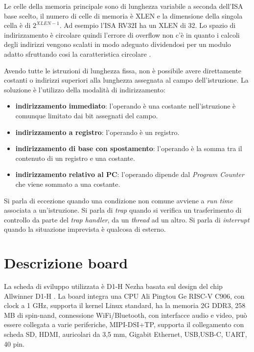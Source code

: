 \documentclass[12pt, a4paper]{report}
\begin{document}
Le celle della memoria principale sono di lunghezza variabile a seconda dell'ISA base scelto, il numero di celle di memoria è XLEN e la dimensione della singola cella è di $2^{XLEN - 1}$. Ad esempio l'ISA RV32I ha un XLEN di 32. Lo spazio di indirizzamento è circolare quindi l'errore di overflow non c'è in quanto i calcoli degli indirizzi vengono scalati in modo adeguato dividendosi per un modulo adatto sfruttando cosi la caratteristica circolare \cite{ISA}.


Avendo tutte le istruzioni di lunghezza fissa, non è possibile avere direttamente costanti o indirizzi superiori alla lunghezza assegnata al campo dell'istruzione. La soluzione è l'utilizzo della modalità di indirizzamento:
\begin{itemize}
	\item \textbf{indirizzamento immediato}: l’operando è una costante nell’istruzione è comunque limitato dai bit assegnati del campo.
	\item \textbf{indirizzamento a registro}: l’operando è un registro.
	\item \textbf{indirizzamento di base con spostamento}: l’operando è la somma tra il
contenuto di un registro e una costante.
\item \textbf{indirizzamento relativo al PC}: l'operando dipende dal \textit{Program Counter} che viene sommato a una costante.
\end{itemize}


Si parla di eccezione quando una condizione non comune avviene a \textit{run time} associata a un'istruzione.
Si parla di \textit{trap} quando si verifica un trasferimento di controllo da parte del \textit{trap handler}, da un \textit{thread} ad un altro. Si parla di \textit{interrupt} quando la situazione imprevista è qualcosa di esterno.



\section{Descrizione board} 

La scheda di sviluppo utilizzata è D1-H Nezha basata sul design del chip Allwinner D1-H \cite{DocH1}. La board integra una CPU Ali Pingtou Ge RISC-V C906, con clock a 1 GHz, supporta il kernel Linux standard, ha la memoria 2G DDR3, 258 MB di spin-nand, connessione WiFi/Bluetooth, con interfacce audio e video, può essere collegata a varie periferiche, MIPI-DSI+TP, supporta il collegamento con scheda SD, HDMI, auricolari da 3,5 mm, Gigabit Ethernet, USB,USB-C, UART, 40 pin.
\end{document}
